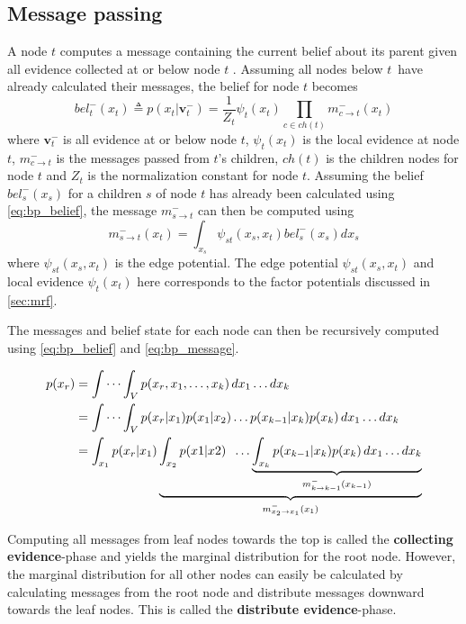\subsection{Message passing}
A node $t$ computes a message containing the current belief about its parent given all evidence collected at or below node $t$ \cite{murphy}. Assuming all nodes below $t$ have already calculated their messages, the belief for node $t$ becomes
\begin{equation}\label{eq:bp_belief}
    bel_t^-(x_t) \triangleq p(x_t | \mathbf{v}_t^-) = \frac{1}{Z_t}\psi_t(x_t) \prod_{c \in ch(t)} m_{c\to t}^-(x_t)
\end{equation}
where $\mathbf{v}_t^-$ is all evidence at or below node $t$, $\psi_t(x_t)$ is the local evidence at node $t$, $m_{c \to t}^-$ is the messages passed from $t$'s children, $ch(t)$ is the children nodes for node $t$ and $Z_t$ is the normalization constant for node $t$.
Assuming the belief $bel_s^-(x_s)$ for a children $s$ of node $t$ has already been calculated using \cref{eq:bp_belief},  the message $m_{s\to t}^-$ can then be computed using
\begin{equation}\label{eq:bp_message}
    m_{s \to t}^-(x_t) = \int_{x_s} \psi_{st}(x_s, x_t) bel_s^-(x_s) dx_s
\end{equation}
where $\psi_{st}(x_s, x_t)$ is the edge potential. The edge potential $\psi_{st}(x_s, x_t)$ and local evidence $\psi_t(x_t)$ here corresponds to the factor potentials discussed in \cref{sec:mrf}.

The messages and belief state for each node can then be recursively computed using \cref{eq:bp_belief} and \cref{eq:bp_message}.

\begin{subequations}
\begin{align}
p(x_r) &= \idotsint_V p(x_r, x_1,\dots,x_k) \,dx_1 \dots dx_k\\
&= \idotsint_V p(x_r | x_1)p(x_1|x_2)\dots p(x_{k-1} | x_k)p(x_k) \, dx_1 \dots dx_k\\
&= \int_{x_1} p(x_r | x_1)\underbrace{\int_{x_2}p(x1 | x2) \; \;  \dots \underbrace{\int_{x_k} p(x_{k-1} | x_k)p(x_k) \, dx_1 \dots dx_k}_{m_{k\to k-1}^-(x_{k-1})}}_{m_{x_2 \to x_1}^-(x_1)}
\end{align}
\end{subequations}

Computing all messages from leaf nodes towards the top is called the \textbf{collecting evidence}-phase and yields the marginal distribution for the root node. However, the marginal distribution for all other nodes can easily be calculated by calculating messages from the root node and distribute messages downward towards the leaf nodes. This is called the \textbf{distribute evidence}-phase. 

